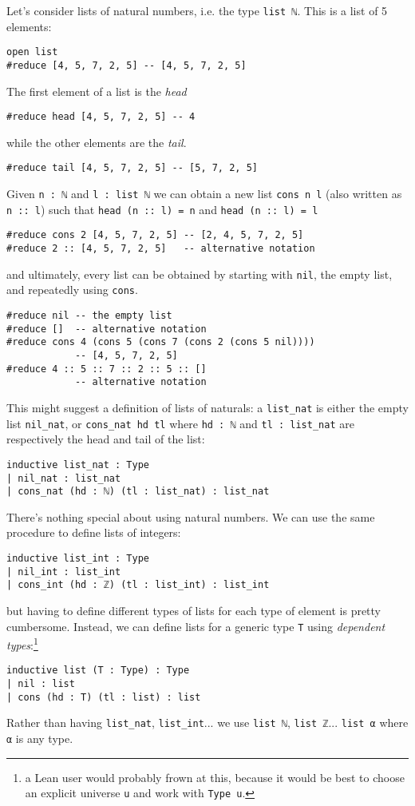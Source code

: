 \documentclass{book}
\theoremstyle{definition}
\theoremstyle{remark}
\theoremstyle{plain}
\begin{document}
Let's consider lists of natural numbers, i.e. the type \lstinline{list ℕ}.
This is a list of 5 elements:
\begin{lstlisting}
open list
#reduce [4, 5, 7, 2, 5] -- [4, 5, 7, 2, 5]
\end{lstlisting}
The first element of a list is the \textit{head}
\begin{lstlisting}
#reduce head [4, 5, 7, 2, 5] -- 4
\end{lstlisting}
while the other elements are the \textit{tail}.
\begin{lstlisting}
#reduce tail [4, 5, 7, 2, 5] -- [5, 7, 2, 5]
\end{lstlisting}
Given \lstinline{n : ℕ} and \lstinline{l : list ℕ} we can obtain a new list
\lstinline{cons n l} (also written as \lstinline{n :: l}) such that
\lstinline{head (n :: l) = n} and \lstinline{head (n :: l) = l}
\begin{lstlisting}
#reduce cons 2 [4, 5, 7, 2, 5] -- [2, 4, 5, 7, 2, 5]
#reduce 2 :: [4, 5, 7, 2, 5]   -- alternative notation  
\end{lstlisting}
and ultimately, every list can be obtained by starting with \lstinline{nil},
the empty list, and repeatedly using \lstinline{cons}.
\begin{lstlisting}
#reduce nil -- the empty list
#reduce []  -- alternative notation 
#reduce cons 4 (cons 5 (cons 7 (cons 2 (cons 5 nil))))
            -- [4, 5, 7, 2, 5]
#reduce 4 :: 5 :: 7 :: 2 :: 5 :: []
            -- alternative notation
\end{lstlisting}
This might suggest a definition of lists of naturals:
a \lstinline{list_nat} is either the empty list \lstinline{nil_nat},
or \lstinline{cons_nat hd tl} where \lstinline{hd : ℕ} and \lstinline{tl : list_nat}
are respectively the head and tail of the list:
\begin{lstlisting}
inductive list_nat : Type
| nil_nat : list_nat
| cons_nat (hd : ℕ) (tl : list_nat) : list_nat
\end{lstlisting}
There's nothing special about using natural numbers.
We can use the same procedure to define lists of integers:
\begin{lstlisting}
inductive list_int : Type
| nil_int : list_int
| cons_int (hd : ℤ) (tl : list_int) : list_int
\end{lstlisting}
but having to define different types of lists for each type of element is pretty cumbersome.
Instead, we can define lists for a generic type \lstinline{T} using \textit{dependent types}:\footnote{a Lean user would probably frown at this,
because it would be best to choose an explicit universe \lstinline{u} and work with \lstinline{Type u}.}
\begin{lstlisting}
inductive list (T : Type) : Type
| nil : list
| cons (hd : T) (tl : list) : list
\end{lstlisting}
Rather than having \lstinline{list_nat}, \lstinline{list_int}...
we use \lstinline{list ℕ}, \lstinline{list ℤ}...
\lstinline{list α} where \lstinline{α} is any type.
\end{document}
